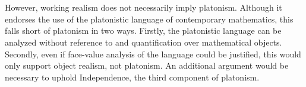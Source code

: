 \documentclass[10pt,a4paper]{article}
\begin{document}
                        \\
                        \\
                        However, working realism does not necessarily imply platonism. Although it endorses the use of the platonistic language of contemporary mathematics, this falls short of platonism in two ways. Firstly, the platonistic language can be analyzed without reference to and quantification over mathematical objects. Secondly, even if face-value analysis of the language could be justified, this would only support object realism, not platonism. An additional argument would be necessary to uphold Independence, the third component of platonism.
                    \subsubsection{}
                        

                            


                        





                        

                


                    \newpage
                    
                    
            
\end{document}
